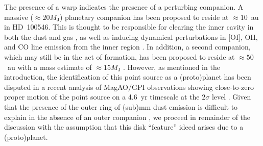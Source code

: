 \documentclass[onecolumn]{aastex6}
\begin{document}
The presence of a warp indicates the presence of a perturbing companion.   A
massive ($\approx 20 M_\mathrm{J}$) planetary companion has been proposed to
reside  at $\approx 10$~au in HD~100546. This is thought to be responsible for
clearing the inner cavity in both  the dust and gas
\citep{mulders13,panic14,walsh14,pinilla15,wright15,garufi16},   as well as
inducing dynamical perturbations in [OI], OH, and CO line emission  from the
inner region \citep{acke06,vanderplas09,brittain14}.    In addition, a second
companion, which may still be in the act of formation,  has been proposed to
reside at $\approx50$~au with a mass estimate of $\approx 15 M_\mathrm{J}$
\citep{quanz13,walsh14,quanz15,currie15,pinilla15}.   However, as mentioned in
the introduction, the identification  of this point source as a (proto)planet
has been disputed in a recent  analysis of MagAO/GPI observations showing
close-to-zero proper motion of  the point source on a 4.6~yr timescale at the
$2\sigma$ level \citep{rameau17}.  Given that the presence of the outer ring of
(sub)mm dust emission is  difficult to explain in the absence of an outer
companion \citep{walsh14,pinilla15},  we proceed in remainder of the discussion
with the assumption that this disk  ``feature'' ideed arises due to a
(proto)planet.
\end{document}
